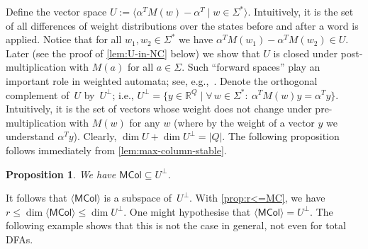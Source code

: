 \documentclass[11pt,a4paper]{amsart}
\newcommand{\R}{\mathbb{R}}
\newcommand{\spn}[1]{\mathord{\langle #1 \rangle}}
\newcommand{\MCol}{\mathsf{MCol}}
\theoremstyle{plain}
\newtheorem{prop}[thm]{Proposition}
\theoremstyle{definition}
\theoremstyle{defC}
\theoremstyle{thmC}
\theoremstyle{plain}
\numberwithin{equation}{section}
\begin{document}
\noindent
Define the vector space $U := \spn{\alpha^T M(w) - \alpha^T \mid w \in \Sigma^*}$. Intuitively, it is the set of all differences of weight distributions over the states before and after a word is applied.
Notice that for all $w_1, w_2 \in \Sigma^*$ we have $\alpha^T M(w_1) - \alpha^T M(w_2) \in U$.
Later (see the proof of \autoref{lem:U-in-NC} below) we show that $U$ is closed under post-multiplication with $M(a)$ for all $a \in \Sigma$.
Such ``forward spaces'' play an important role in weighted automata; see, e.g.,~\cite{KieferWeighted20}.
Denote the orthogonal complement of~$U$ by~$U^\bot$; i.e., $U^\bot = \{y \in \R^Q \mid \forall\,w \in \Sigma^*: \ \alpha^T M(w) y = \alpha^T y\}$. Intuitively, it is the set of vectors whose weight does not change under pre-multiplication with $M(w)$ for any $w$ (where by the weight of a vector $y$ we understand $\alpha^T y$).
Clearly, $\dim U + \dim U^\bot = |Q|$.
The following proposition follows immediately from \autoref{lem:max-column-stable}.

\begin{prop} \label{prop:MC<=V}
We have $\MCol \subseteq U^\bot$.
\end{prop}

\noindent
It follows that $\spn{\MCol}$ is a subspace of~$U^\bot$.
With \autoref{prop:r<=MC}, we have $r \le \dim \spn{\MCol} \le \dim U^\bot$.
One might hypothesise that $\spn{\MCol} = U^\bot$.
The following example  shows that this is not the case in general, not even for total DFAs.
\end{document}
